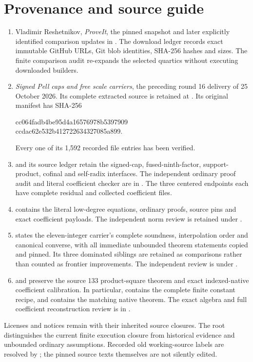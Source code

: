 \section{Provenance and source guide}
\begin{enumerate}
\item Vladimir Reshetnikov, \emph{ProveIt}, the pinned snapshot and later
explicitly identified comparison updates in .
The download ledger records exact immutable GitHub URLs, Git blob identities,
SHA-256 hashes and sizes. The finite comparison audit re-expands the selected
quartics without executing downloaded builders.
\item \emph{Signed Pell caps and free scale carriers}, the preceding
round 16 delivery of 25 October 2026. Its complete extracted source is retained
at . Its original manifest has SHA-256
\begin{center}\small\ttfamily
cc064fadb4be95d4a16576978b5397909\\
ccdac62e532b412722634327085a899.
\end{center}
Every one of its 1,592 recorded file entries has been verified.
\item {} and its source ledger retain the signed-cap,
fused-ninth-factor, support-product, cofinal and self-radix interfaces.
The independent ordinary proof audit and literal coefficient checker are
in . The three centered endpoints each have complete
residual and collected coefficient files.
\item {} contains the literal low-degree equations,
ordinary proofs, source pins and exact coefficient payloads.
The independent norm review is retained under .
\item {} states the eleven-integer carrier's complete
soundness, interpolation order and canonical converse, with all immediate
unbounded theorem statements copied and pinned. Its three dominated siblings
are retained as comparisons rather than counted as frontier improvements.
The independent review is under .
\item {} and  preserve the
source 133 product-square theorem and exact indexed-native coefficient
calibration. In particular,
contains the complete finite constant recipe, and
contains the matching native theorem. The exact algebra and full coefficient
reconstruction review is in .
\end{enumerate}
Licenses and notices remain with their inherited source closures. The root
 distinguishes the current finite execution closure
from historical evidence and unbounded ordinary assumptions. Recorded old
working-source labels are resolved by ;
the pinned source texts themselves are not silently edited.

